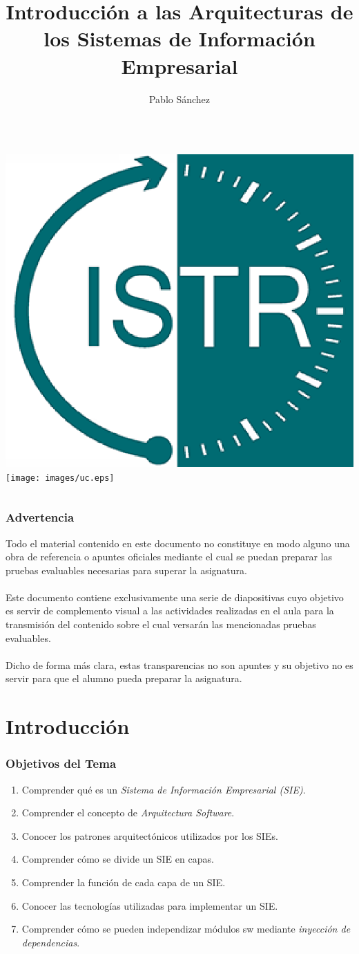 \documentclass[handout,a4paper,t,xcolor=pst,dvips,colortheme]{beamer}
\title[Arquitecturas SIE]{Introducción a las Arquitecturas de los Sistemas de Información Empresarial}
\author[Pablo Sánchez]{\alert{Pablo Sánchez}}
\institute[IIE]{
		   Dpto. Ingeniería Informática y Electrónica \\
		   Universidad de Cantabria \\
		   Santander (Cantabria, España) \\
		   \texttt{p.sanchez@unican.es}
}
\date{}
\begin{document}
\begin{frame}[c]
	\titlepage
	\begin{columns}
			\centering
    		\includegraphics[width=.28\textwidth,keepaspectratio=true]{images/istr.eps}
			\centering
			\texttt{[image: images/uc.eps]}
	\end{columns}
\end{frame}

\begin{frame}[c]
    \frametitle{\alert{Advertencia}}
    \begin{center}
        Todo el material contenido en este documento no constituye en modo alguno una obra de referencia o apuntes oficiales mediante el cual se puedan preparar las pruebas evaluables necesarias para superar la asignatura. \ \\
        \ \\
        Este documento contiene exclusivamente una serie de diapositivas cuyo objetivo es servir de complemento visual a las actividades realizadas en el aula para la transmisión del contenido sobre el cual versarán las mencionadas pruebas evaluables.  \ \\
        \ \\
        Dicho de forma más clara, \alert{estas transparencias no son apuntes y su objetivo no es servir para que el alumno pueda preparar la asignatura.}
    \end{center}
\end{frame}

\section{Introducción}

\begin{frame}[c]
    \frametitle{Objetivos del Tema}
    \begin{enumerate}[<+->]
         \item Comprender qué es un \emph{Sistema de Información Empresarial (SIE)}.
         \item Comprender el concepto de \emph{Arquitectura Software}.
         \item Conocer los patrones arquitectónicos utilizados por los SIEs.
         \item Comprender cómo se divide un SIE en capas.
         \item Comprender la función de cada capa de un SIE.
         \item Conocer las tecnologías utilizadas para implementar un SIE.
         \item Comprender cómo se pueden independizar módulos sw mediante \emph{inyección de dependencias}.
    \end{enumerate}
\end{frame}
\end{document}
